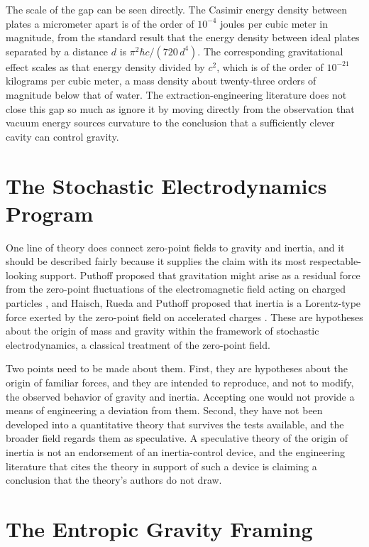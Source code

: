 \documentclass[11pt]{article}
\begin{document}
The scale of the gap can be seen directly. The Casimir energy density between plates a micrometer apart is of the order of $10^{-4}$ joules per cubic meter in magnitude, from the standard result that the energy density between ideal plates separated by a distance $d$ is $\pi^2\hbar c/(720\,d^4)$. The corresponding gravitational effect scales as that energy density divided by $c^2$, which is of the order of $10^{-21}$ kilograms per cubic meter, a mass density about twenty-three orders of magnitude below that of water. The extraction-engineering literature does not close this gap so much as ignore it by moving directly from the observation that vacuum energy sources curvature to the conclusion that a sufficiently clever cavity can control gravity.

\section{The Stochastic Electrodynamics Program}

One line of theory does connect zero-point fields to gravity and inertia, and it should be described fairly because it supplies the claim with its most respectable-looking support. Puthoff proposed that gravitation might arise as a residual force from the zero-point fluctuations of the electromagnetic field acting on charged particles \cite{P1989}, and Haisch, Rueda and Puthoff proposed that inertia is a Lorentz-type force exerted by the zero-point field on accelerated charges \cite{HRP1994}. These are hypotheses about the origin of mass and gravity within the framework of stochastic electrodynamics, a classical treatment of the zero-point field.

Two points need to be made about them. First, they are hypotheses about the origin of familiar forces, and they are intended to reproduce, and not to modify, the observed behavior of gravity and inertia. Accepting one would not provide a means of engineering a deviation from them. Second, they have not been developed into a quantitative theory that survives the tests available, and the broader field regards them as speculative. A speculative theory of the origin of inertia is not an endorsement of an inertia-control device, and the engineering literature that cites the theory in support of such a device is claiming a conclusion that the theory's authors do not draw.

\section{The Entropic Gravity Framing}
\end{document}
